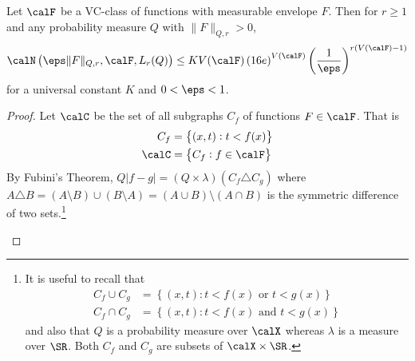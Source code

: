 \begin{theorem}
	\label{thm:vdv2.6.7}
	Let \(\calF\) be a VC-class of functions with measurable envelope \(F\). Then for \(r\geq 1\) and any probability measure \(Q\) with \(\|F\|_{Q,r} > 0\),
	\begin{equation}
		\label{eq:vc-function-covering}
		\calN\left(\eps\|F\|_{Q,r},\calF,L_r(Q)\right) \leq KV(\calF)\left(16e\right)^{V(\calF)}\left(\frac{1}{\eps}\right)^{r(V(\calF)-1)}
	\end{equation}
	for a universal constant \(K\) and \(0 < \eps < 1\).
\end{theorem}
\begin{proof}
	Let \(\calC\) be the set of all subgraphs \(C_f\) of functions \(F\in\calF\). That is
	\begin{align*}
		C_f &= \left\{(x,t): t < f(x)\right\} \\
		\calC &= \left\{C_f: f\in\calF\right\}
	\end{align*}
	By Fubini's Theorem, \(Q|f-g| = \left(Q\times\lambda\right)\left(C_f\triangle C_g\right)\) where \(A\triangle B = (A\setminus B)\cup(B\setminus A) = (A\cup B) \setminus (A\cap B)\) is the symmetric difference of two sets.\footnote{It is useful to recall that 
	\begin{align*}
		C_f \cup C_g &= \left\{(x,t): t < f(x)\text{ or }t < g(x)\right\} \\
		C_f \cap C_g &= \left\{(x,t): t < f(x)\text{ and }t< g(x)\right\}
	\end{align*}
	and also that \(Q\) is a probability measure over \(\calX\) whereas \(\lambda\) is a measure over \(\SR\). Both \(C_f\) and \(C_g\) are subsets of \(\calX\times\SR\).}
	\begin{figure}[htpb]
		\centering
\end{figure}
\end{proof}
